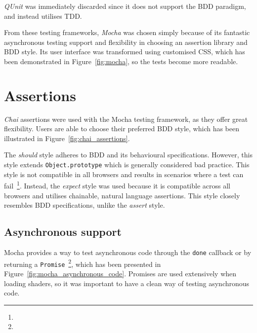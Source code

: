 {{		\emph{QUnit} was immediately discarded since it does not support the BDD paradigm, and instead utilises TDD.

		From these testing frameworks, \emph{Mocha} was chosen simply because of its fantastic asynchronous testing support and flexibility in choosing an assertion library and BDD style. Its user interface was transformed using customised CSS, which has been demonstrated in Figure~\ref{fig:mocha}, so the tests become more readable.

		

	}

}

\section{Assertions} {
\label{sec:assertions}

	\emph{Chai} assertions were used with the Mocha testing framework, as they offer great flexibility. Users are able to choose their preferred BDD style, which has been illustrated in Figure~\ref{fig:chai_assertions}.

	

	The \emph{should} style adheres to BDD and its behavioural specifications. However, this style extends \texttt{Object.prototype} which is generally considered bad practice. This style is not compatible in all browsers and results in scenarios where a test can fail~\footnote{}. Instead, the \emph{expect} style was used because it is compatible across all browsers and utilises chainable, natural language assertions. This style closely resembles BDD specifications, unlike the \emph{assert} style.

	\subsection{Asynchronous support} {
	\label{sec:testing_asynchronous_support}

		Mocha provides a way to test asynchronous code through the \texttt{done} callback or by returning a \texttt{Promise}~\footnote{}, which has been presented in Figure~\ref{fig:mocha_asynchronous_code}. Promises are used extensively when loading shaders, so it was important to have a clean way of testing asynchronous code. 

		

}}
